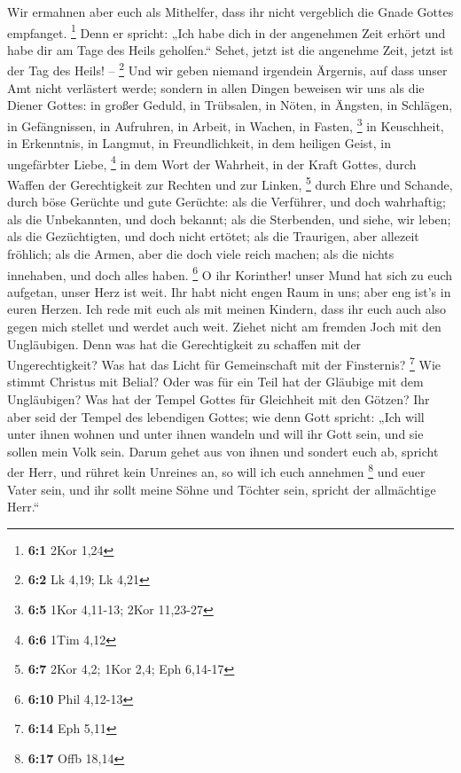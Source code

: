  Wir ermahnen aber euch als Mithelfer, dass ihr nicht
vergeblich die Gnade Gottes empfanget. \footnote{\textbf{6:1} 2Kor 1,24}
 Denn er spricht: „Ich habe dich in der angenehmen Zeit
erhört und habe dir am Tage des Heils geholfen.`` Sehet, jetzt ist die
angenehme Zeit, jetzt ist der Tag des Heils! -- \footnote{\textbf{6:2}
  Lk 4,19; Lk 4,21}  Und wir geben niemand irgendein
Ärgernis, auf dass unser Amt nicht verlästert werde; 
sondern in allen Dingen beweisen wir uns als die Diener Gottes: in
großer Geduld, in Trübsalen, in Nöten, in Ängsten,  in
Schlägen, in Gefängnissen, in Aufruhren, in Arbeit, in Wachen, in
Fasten, \footnote{\textbf{6:5} 1Kor 4,11-13; 2Kor 11,23-27}
 in Keuschheit, in Erkenntnis, in Langmut, in
Freundlichkeit, in dem heiligen Geist, in ungefärbter Liebe, \footnote{\textbf{6:6}
  1Tim 4,12}  in dem Wort der Wahrheit, in der Kraft
Gottes, durch Waffen der Gerechtigkeit zur Rechten und zur Linken,
\footnote{\textbf{6:7} 2Kor 4,2; 1Kor 2,4; Eph 6,14-17} 
durch Ehre und Schande, durch böse Gerüchte und gute Gerüchte: als die
Verführer, und doch wahrhaftig;  als die Unbekannten, und
doch bekannt; als die Sterbenden, und siehe, wir leben; als die
Gezüchtigten, und doch nicht ertötet;  als die Traurigen,
aber allezeit fröhlich; als die Armen, aber die doch viele reich machen;
als die nichts innehaben, und doch alles haben. \footnote{\textbf{6:10}
  Phil 4,12-13}  O ihr Korinther! unser Mund hat sich zu
euch aufgetan, unser Herz ist weit.  Ihr habt nicht engen
Raum in uns; aber eng ist's in euren Herzen.  Ich rede
mit euch als mit meinen Kindern, dass ihr euch auch also gegen mich
stellet und werdet auch weit.  Ziehet nicht am fremden
Joch mit den Ungläubigen. Denn was hat die Gerechtigkeit zu schaffen mit
der Ungerechtigkeit? Was hat das Licht für Gemeinschaft mit der
Finsternis? \footnote{\textbf{6:14} Eph 5,11}  Wie stimmt
Christus mit Belial? Oder was für ein Teil hat der Gläubige mit dem
Ungläubigen?  Was hat der Tempel Gottes für Gleichheit
mit den Götzen? Ihr aber seid der Tempel des lebendigen Gottes; wie denn
Gott spricht: „Ich will unter ihnen wohnen und unter ihnen wandeln und
will ihr Gott sein, und sie sollen mein Volk sein.  Darum
gehet aus von ihnen und sondert euch ab, spricht der Herr, und rühret
kein Unreines an, so will ich euch annehmen \footnote{\textbf{6:17} Offb
  18,14}  und euer Vater sein, und ihr sollt meine Söhne
und Töchter sein, spricht der allmächtige Herr.``

